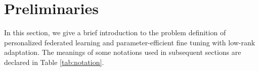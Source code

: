 \documentclass[sigconf]{acmart}
\newcommand\our{\text{FDLoRA}}
\begin{document}



\section{Preliminaries} \label{sec:preliminaries}
In this section, we give a brief introduction to the problem definition of personalized federated learning and parameter-efficient fine tuning with low-rank adaptation. The meanings of some notations used in subsequent sections are declared in Table \ref{tab:notation}.
\end{document}
